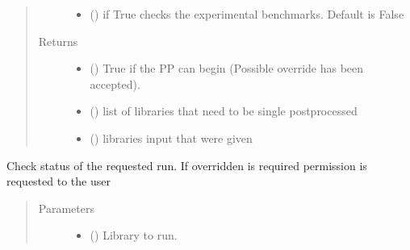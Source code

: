 \documentclass[letterpaper,10pt,english]{sphinxmanual}
\begin{document}
\begin{fulllineitems}
\begin{fulllineitems}
\begin{quote}
\begin{description}
\begin{itemize}
\item {} 
\sphinxAtStartPar
{} () \textendash{} if True checks the experimental benchmarks. Default is False

\end{itemize}

\item[{Returns}] \leavevmode
\sphinxAtStartPar
\begin{itemize}
\item {} 
\sphinxAtStartPar
{} () \textendash{} True if the PP can begin (Possible override has been accepted).

\item {} 
\sphinxAtStartPar
{} () \textendash{} list of libraries that need to be single post\sphinxhyphen{}processed

\item {} 
\sphinxAtStartPar
{} () \textendash{} libraries input that were given

\end{itemize}


\end{description}\end{quote}

\end{fulllineitems}


\begin{fulllineitems}
\label{\detokenize{api/initobjects:status.Status.check_override_run}}
\sphinxAtStartPar
Check status of the requested run. If overridden is required permission
is requested to the user
\begin{quote}\begin{description}
\item[{Parameters}] \leavevmode\begin{itemize}
\item {} 
\sphinxAtStartPar
{} () \textendash{} Library to run.


\end{itemize}
\end{description}
\end{quote}
\end{fulllineitems}
\end{fulllineitems}
\end{document}
